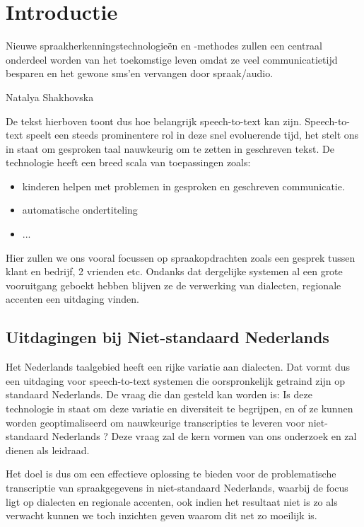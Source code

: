 

\section{Introductie}%
\label{sec:introductie}
\epigraph{Nieuwe spraakherkenningstechnologieën en -methodes zullen een centraal onderdeel worden van 
    het toekomstige leven omdat ze veel communicatietijd besparen en het gewone sms'en 
    vervangen door spraak/audio.}{Natalya Shakhovska}
    
De tekst hierboven toont dus hoe belangrijk speech-to-text kan zijn. 
Speech-to-text speelt een steeds prominentere rol in deze snel evoluerende tijd, het stelt ons in staat om gesproken taal nauwkeurig om te zetten in geschreven tekst. De technologie heeft een breed scala van toepassingen zoals:
\begin{itemize}
    \item kinderen helpen met problemen in gesproken en geschreven communicatie.\autocite{}
    \item automatische ondertiteling
    \item ...
\end{itemize}

Hier zullen we ons vooral focussen op spraakopdrachten zoals een gesprek tussen klant en bedrijf, 2 vrienden etc.
Ondanks dat dergelijke systemen al een grote vooruitgang geboekt hebben blijven ze de verwerking van dialecten, regionale accenten een uitdaging vinden.

\subsection{Uitdagingen bij Niet-standaard Nederlands}
Het Nederlands taalgebied heeft een rijke variatie aan dialecten. Dat vormt dus een uitdaging voor speech-to-text systemen die oorspronkelijk getraind zijn op standaard Nederlands. De vraag die dan gesteld kan worden is: Is deze technologie in staat om deze variatie en diversiteit te begrijpen, en of ze kunnen worden geoptimaliseerd om nauwkeurige transcripties te leveren voor niet-standaard Nederlands ?
Deze vraag zal de kern vormen van ons onderzoek en zal dienen als leidraad.

Het doel is dus om een effectieve oplossing te bieden voor de problematische transcriptie van spraakgegevens in niet-standaard Nederlands, waarbij de focus ligt op dialecten en regionale accenten, ook indien het resultaat niet is zo als verwacht kunnen we toch inzichten geven waarom dit net zo moeilijk is. 

